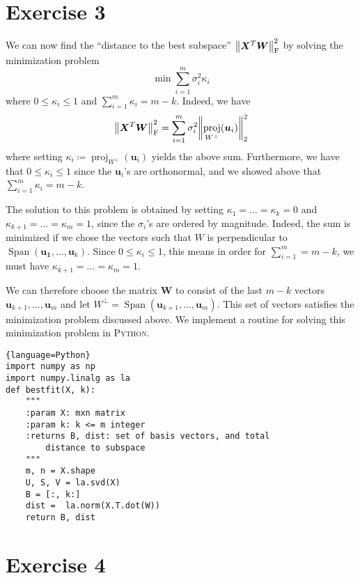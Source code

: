\documentclass[article, a4paper, oneside, 12pt]{memoir}
\DeclareMathOperator{\proj}{proj}
\DeclareMathOperator{\Span}{Span}
\newcommand{\mat}[1]{\bm{#1}}
\newcommand{\frob}[1]{\norm{#1}_{\mathrm{F}}}
\begin{document}
\chapter*{Exercise 3}

We can now find the ``distance to the best subspace'' \(
\frob{\mat{X}^T\mat{W}}^2 \) by solving the minimization problem
\begin{equation}
    \min \sum_{i=1}^m \sigma_i^2 \kappa_i
\end{equation}
where \( 0 \leq \kappa_i \leq 1 \) and \( \sum_{i=1}^m \kappa_i = m - k \).
Indeed, we have
\begin{equation}
    \frob{\mat{X}^T\mat{W}}^2 = \sum_{i = 1}^m \sigma_i^2 \norm{\proj_{W^\perp}(\mat{u}_i)}^2_2
\end{equation}
where setting \( \kappa_i \coloneqq \proj_{W^\perp}(\mat{u}_i) \) yields the
above sum. Furthermore, we have that \( 0 \leq \kappa_i \leq 1 \) since the \(
\mat{u}_i\)'s are orthonormal, and we showed above that \( \sum_{i=1}^m \kappa_i
= m - k \).

The solution to this problem is obtained by setting \( \kappa_1 = \ldots =
\kappa_k = 0 \) and \( \kappa_{k+1} = \ldots = \kappa_{m} = 1 \), since the \(
\sigma_i\)'s are ordered by magnitude. Indeed, the sum is minimized if we chose
the vectors such that \( W \) is perpendicular to \( \Span({\mat{u_1},
\ldots, \mat{u}_k}) \). Since \( 0 \leq \kappa_i \leq 1 \), this means in order
for \( \sum_{i = 1}^m = m - k \), we must have \( \kappa_{k+1} = \ldots =
\kappa_{m} = 1\).

We can therefore choose the matrix \( \mat{W} \) to consist of the last \( m -
k \) vectors \( \mat{u}_{k+1}, \ldots, \mat{u}_{m} \) and let \( W^\perp =
\Span(\mat{u}_{k+1}, \ldots, \mat{u}_m) \). This set of vectors satisfies the
minimization problem discussed above.
We implement a routine for solving this minimization problem in
\textsc{Python}. 

\begin{lstlisting}{language=Python}
import numpy as np
import numpy.linalg as la
def bestfit(X, k):
    """
    :param X: mxn matrix
    :param k: k <= m integer
    :returns B, dist: set of basis vectors, and total 
        distance to subspace
    """
    m, n = X.shape
    U, S, V = la.svd(X)
    B = [:, k:]
    dist =  la.norm(X.T.dot(W))
    return B, dist
\end{lstlisting}

\chapter*{Exercise 4}
\end{document}
